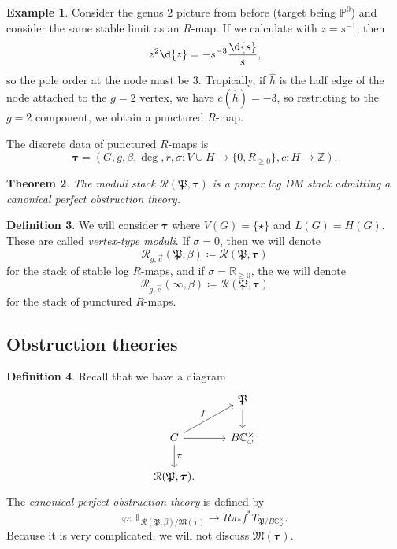 \documentclass[10pt]{amsart}
\newtheorem{thm}{Theorem}[section]
\theoremstyle{definition}
\newtheorem{defn}[thm]{Definition}
\newtheorem{exm}[thm]{Example}
\theoremstyle{remark}
\theoremstyle{plain}
\theoremstyle{definition}
\theoremstyle{remark}
\newcommand{\R}{\mathbb{R}}
\newcommand{\C}{\mathbb{C}}
\newcommand{\Z}{\mathbb{Z}}
\renewcommand{\P}{\mathbb{P}}
\newcommand{\mc}[1]{\mathcal{#1}}
\newcommand{\mf}[1]{\mathfrak{#1}}
\newcommand{\btau}{\bm{\tau}}
\newcommand{\ol}[1]{\overline{#1}}
\newcommand{\1}{\mathbf{1}}
\newcommand{\2}{\mathbf{2}}
\newcommand{\3}{\mathbf{3}}
\begin{document}
\begin{exm}
    Consider the genus $2$ picture from before (target being $\P^0$) and consider the same stable limit as an $R$-map. If we calculate with $z = s^{-1}$, then
    \[ z^2 \d{z} = -s^{-3} \frac{\d{s}}{s}, \]
    so the pole order at the node must be $3$. Tropically, if $\hat{h}$ is the half edge of the node attached to the $g=2$ vertex, we have $c(\hat{h}) = -3$, so restricting to the $g=2$ component, we obtain a punctured $R$-map.
\end{exm}

The discrete data of punctured $R$-maps is
\[ \bm{\tau} = (G, g, \beta, \deg, \ol{r}, \sigma\colon V \cup H \to \{0,R_{\geq 0}\}, c \colon H \to \Z). \]

\begin{thm}
    The moduli stack $\mc{R}(\mf{P}, \bm{\tau})$ is a proper log DM stack admitting a canonical perfect obstruction theory.
\end{thm}


\begin{defn}
    We will consider $\bm{\tau}$ where $V(G) = \{\star\}$ and $L(G) = H(G)$. These are called \textit{vertex-type moduli}. If $\sigma = 0$, then we will denote
    \[ \mc{R}_{g,\vec{c}}(\mf{P}, \beta) \coloneqq \mc{R}(\mf{P}, \bm{\tau}) \]
    for the stack of stable log $R$-maps,
    and if $\sigma = \R_{\geq 0}$, the we will denote
    \[ \mc{R}_{g,\vec{c}}(\infty, \beta) \coloneqq \mc{R}(\mf{P}, \btau) \]
    for the stack of punctured $R$-maps.
\end{defn}

\subsection{Obstruction theories}%
\label{sub:The canonical perfect obstruction theory}


\begin{defn}
    Recall that we have a diagram
    \begin{equation*}
    \begin{tikzcd}
        & \mf{P} \ar{d} \\
        C \ar{r} \ar{d}{\pi} \ar{ur}{f} & B \C_{\omega}^{\times} \\
        \mc{R}(\mf{P}, \btau).
    \end{tikzcd}
    \end{equation*}
    The \textit{canonical perfect obstruction theory} is defined by
    \[ \varphi \colon \mathbb{T}_{\mc{R}(\mf{P}, \beta)/\mf{M}(\btau)} \to R \pi_* f^* T_{\mf{P}/B\C_{\omega}^{\times}}. \]
    Because it is very complicated, we will not discuss $\mf{M}(\btau)$.
\end{defn}
\end{document}

